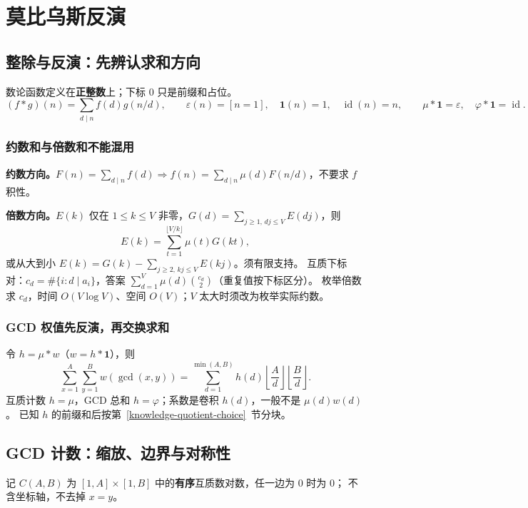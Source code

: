 \Needspace{180pt}

\section{莫比乌斯反演}

\subsection{整除与反演：先辨认求和方向}\label{knowledge-mobius-model}
数论函数定义在\textbf{正整数}上；下标 0 只是前缀和占位。
\[
(f*g)(n)=\sum_{d\mid n}f(d)g(n/d),\qquad
\varepsilon(n)=[n=1],\quad \mathbf1(n)=1,\quad \operatorname{id}(n)=n,
\qquad \mu*\mathbf1=\varepsilon,\quad \varphi*\mathbf1=\operatorname{id}.
\]

\subsubsection{约数和与倍数和不能混用}
\textbf{约数方向。}$F(n)=\sum_{d\mid n}f(d)\Rightarrow f(n)=\sum_{d\mid n}\mu(d)F(n/d)$，不要求 $f$ 积性。

\textbf{倍数方向。}$E(k)$ 仅在 $1\le k\le V$ 非零，$G(d)=\sum_{j\ge1,\,dj\le V}E(dj)$，则
\[
E(k)=\sum_{t=1}^{\lfloor V/k\rfloor}\mu(t)G(kt),
\]
或从大到小 $E(k)=G(k)-\sum_{j\ge2,\,kj\le V}E(kj)$。须有限支持。
互质下标对：$c_d=\#\{i:d\mid a_i\}$，答案 $\sum_{d=1}^V\mu(d)\binom{c_d}{2}$（重复值按下标区分）。
枚举倍数求 $c_d$，时间 $O(V\log V)$、空间 $O(V)$；$V$ 太大时须改为枚举实际约数。

\subsubsection{GCD 权值先反演，再交换求和}
令 $h=\mu*w$（$w=h*\mathbf1$），则
\[
\sum_{x=1}^A\sum_{y=1}^B w(\gcd(x,y))
=\sum_{d=1}^{\min(A,B)}h(d)
\left\lfloor\frac Ad\right\rfloor\left\lfloor\frac Bd\right\rfloor.
\]
互质计数 $h=\mu$，GCD 总和 $h=\varphi$；系数是卷积 $h(d)$，一般不是 $\mu(d)w(d)$。
已知 $h$ 的前缀和后按第~\ref{knowledge-quotient-choice}~节分块。



\subsection{GCD 计数：缩放、边界与对称性}\label{knowledge-gcd-domains}
记 $C(A,B)$ 为 $[1,A]\times[1,B]$ 中的\textbf{有序}互质数对数，任一边为 0 时为 0；
不含坐标轴，不去掉 $x=y$。


